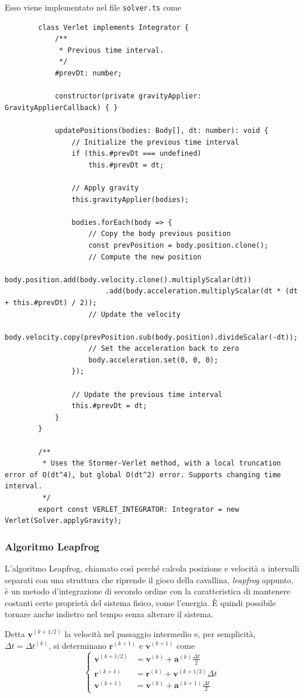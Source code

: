 \documentclass[11pt]{article}
\begin{document}
	Esso viene implementato nel file \texttt{solver.ts} come 
	\begin{verbatim}
		class Verlet implements Integrator {
			/**
			 * Previous time interval.
			 */
			#prevDt: number; 

			constructor(private gravityApplier: GravityApplierCallback) { }

			updatePositions(bodies: Body[], dt: number): void {
				// Initialize the previous time interval
				if (this.#prevDt === undefined)
					this.#prevDt = dt;

				// Apply gravity
				this.gravityApplier(bodies);

				bodies.forEach(body => {
					// Copy the body previous position
					const prevPosition = body.position.clone();
					// Compute the new position
					body.position.add(body.velocity.clone().multiplyScalar(dt))
						.add(body.acceleration.multiplyScalar(dt * (dt + this.#prevDt) / 2));
					// Update the velocity
					body.velocity.copy(prevPosition.sub(body.position).divideScalar(-dt));
					// Set the acceleration back to zero
					body.acceleration.set(0, 0, 0);
				});

				// Update the previous time interval
				this.#prevDt = dt;
			}
		}

		/**
		 * Uses the Stormer-Verlet method, with a local truncation error of O(dt^4), but global O(dt^2) error. Supports changing time interval.
		 */
		export const VERLET_INTEGRATOR: Integrator = new Verlet(Solver.applyGravity);
	\end{verbatim}

	\subsubsection{Algoritmo Leapfrog}

	L'algoritmo Leapfrog\cite{LeapFrog}, chiamato così perché calcola posizione e velocità a intervalli separati con una struttura che riprende il gioco della cavallina, \emph{leapfrog} appunto, è un metodo d'integrazione di secondo ordine con la caratteristica di mantenere costanti certe proprietà del sistema fisico, come l'energia. È quindi possibile tornare anche indietro nel tempo senza alterare il sistema.

	\begin{tcolorbox}[title=Algoritmo Leapfrog (kick-drift-kick)]
		Detta $\mathbf{v}^{(k + 1/2)}$ la velocità nel passaggio intermedio e, per semplicità, $\Delta t = \Delta t^{(k)}$, si determinano $\mathbf{r}^{(k + 1)}$ e $\mathbf{v}^{(k + 1)}$ come
		\begin{equation}
			\left\{
			\begin{aligned}
				\mathbf{v}^{(k + 1/2)} &= \mathbf{v}^{(k)} + \mathbf{a}^{(k)}\frac{\Delta t}{2} \\
				\mathbf{r}^{(k + 1)} &= \mathbf{r}^{(k)} + \mathbf{v}^{(k + 1/2)}\Delta t \\
				\mathbf{v}^{(k + 1)} &= \mathbf{v}^{(k)} + \mathbf{a}^{(k + 1)}\frac{\Delta t}{2}
			\end{aligned}
			\right.
		\end{equation}
	\end{tcolorbox}
\end{document}
